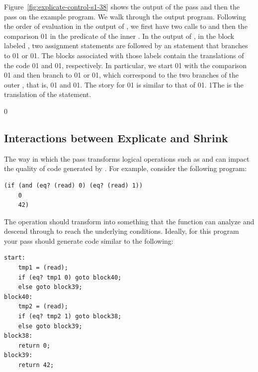 \documentclass[7x10]{TimesAPriori_MIT}%
\def\racketEd{0}
\def\pythonEd{1}
\def\edition{1}
\newcommand{\racket}[1]{{\if\edition\racketEd{#1}\fi}}
\newcommand{\pythonColor}[0]{}
\newcommand{\python}[1]{{\if\edition\pythonEd\pythonColor #1\fi}}
\numberwithin{theorem}{chapter}
\numberwithin{definition}{chapter}
\numberwithin{equation}{chapter}
\begin{document}
Figure~\ref{fig:explicate-control-s1-38} shows the output of the
 pass and then the
 pass on the example program. We walk through
the output program.
%
Following the order of evaluation in the output of
, we first have two calls to \CREAD{}
and then the comparison \racket{}\python{}
in the predicate of the inner .  In the output of
, in the
block labeled , two assignment statements are followed by an
 statement that branches to \racket{}\python{}
or \racket{}\python{}.
The blocks associated with those labels contain the
translations of the code
\racket{}\python{}
and
\racket{}\python{},
respectively.  In particular, we start
\racket{}\python{}
with the comparison
\racket{}\python{}
and then branch to \racket{}\python{}
or \racket{}\python{},
which correspond to the two branches of the outer , that is,
\racket{}\python{} and
\racket{}\python{}.
%
The story for \racket{}\python{}
is similar to that of \racket{}\python{}.
%
\python{The  is the translation of the \code{print} statement.}


{\if\edition\racketEd

\subsection{Interactions between Explicate and Shrink}
  
The way in which the  pass transforms logical operations
such as  and  can impact the quality of code
generated by . For example, consider the
following program:
\begin{lstlisting}
(if (and (eq? (read) 0) (eq? (read) 1))
    0
    42)  
\end{lstlisting}
The  operation should transform into something that the
 function can analyze and descend through to
reach the underlying  conditions. Ideally, for this program
your  pass should generate code similar to
the following:
\begin{center}
\begin{minipage}{\textwidth}
\begin{lstlisting}
start:
    tmp1 = (read);
    if (eq? tmp1 0) goto block40;
    else goto block39;
block40:
    tmp2 = (read);
    if (eq? tmp2 1) goto block38;
    else goto block39;
block38:
    return 0;
block39:
    return 42;
\end{lstlisting}
\end{minipage}
\end{center}
\fi}
\end{document}
